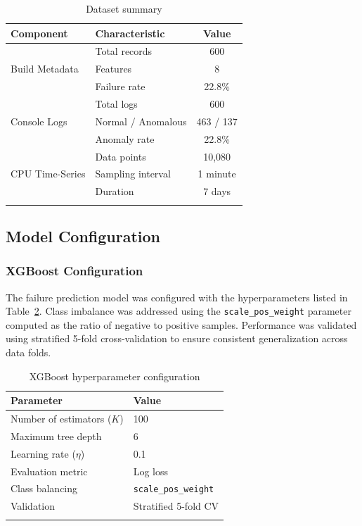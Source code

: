 \documentclass[sn-nature]{sn-jnl}
\theoremstyle{thmstyleone}
\theoremstyle{thmstyletwo}
\theoremstyle{thmstylethree}
\begin{document}
\begin{table}[htbp]
\caption{Dataset summary}\label{tab:dataset}
\begin{tabular}{@{}llc@{}}
\toprule
\textbf{Component} & \textbf{Characteristic} & \textbf{Value} \\
\midrule
\multirow{3}{*}{Build Metadata} & Total records & 600 \\
 & Features & 8 \\
 & Failure rate & 22.8\% \\
\midrule
\multirow{3}{*}{Console Logs} & Total logs & 600 \\
 & Normal / Anomalous & 463 / 137 \\
 & Anomaly rate & 22.8\% \\
\midrule
\multirow{3}{*}{CPU Time-Series} & Data points & 10,080 \\
 & Sampling interval & 1 minute \\
 & Duration & 7 days \\
\botrule
\end{tabular}
\end{table}

\subsection{Model Configuration}\label{subsec:modelconfig}

\subsubsection{XGBoost Configuration}
The failure prediction model was configured with the hyperparameters listed in Table~\ref{tab:xgbconfig}.
Class imbalance was addressed using the \texttt{scale\_pos\_weight} parameter computed as the ratio of negative to positive samples.
Performance was validated using stratified 5-fold cross-validation to ensure consistent generalization across data folds.

\begin{table}[htbp]
\caption{XGBoost hyperparameter configuration}\label{tab:xgbconfig}
\begin{tabular}{@{}ll@{}}
\toprule
\textbf{Parameter} & \textbf{Value} \\
\midrule
Number of estimators ($K$) & 100 \\
Maximum tree depth & 6 \\
Learning rate ($\eta$) & 0.1 \\
Evaluation metric & Log loss \\
Class balancing & \texttt{scale\_pos\_weight} \\
Validation & Stratified 5-fold CV \\
\botrule
\end{tabular}
\end{table}
\end{document}
